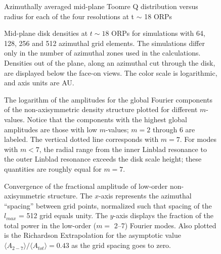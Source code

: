 \documentclass[manuscript]{aastex}
\begin{document}


\newpage

\begin{figure}
\caption{Azimuthally averaged mid-plane Toomre Q distribution versus radius for each of the four resolutions at t $\sim$ 18 ORPs}
\label{fig:Final_Q}
\end{figure}

\begin{figure}
\caption
{
Mid-plane disk densities at $t \sim 18$ ORPs for simulations with 64, 128, 256 and 512 azimuthal grid elements.
The simulations differ only in the number of  azimuthal zones used in the calculations.  Densities out of the plane, along an azimuthal cut through the disk, are displayed below the face-on views.  The color scale is logarithmic, and axis units are AU. 
}
\label{fig:DensityPlots}
\end{figure}
\newpage

\begin{figure}
\caption
{
The logarithm of the amplitudes for the global Fourier components of the non-axisymmetric density structure plotted for different $m$-values. Notice that the components with the highest global amplitudes are those with low $m$-values; $m=2$ through 6 are labeled.  The vertical dotted line corresponds with $m=7$.  For modes with $m < 7$,  the radial range from  the inner Linblad resonance to the outer Linblad resonance exceeds the disk scale height; these quantities are roughly equal for $m = 7$.
}
\label{fig:Am_vs_log_m}
\end{figure}

\begin{figure}
\caption
{
Convergence of the fractional amplitude of low-order non-axisymmetric structure.  The $x$-axis represents
the azimuthal ``spacing'' between grid points,  normalized such that spacing of the $l_{max}$ = 512 grid
equals unity.
The $y$-axis displays the fraction of the total power in the low-order ($m = $ 2--7) Fourier modes. 
Also plotted is the Richardson Extrapolation for the asymptotic value  
$\langle A_{2-7} \rangle / \langle A_{tot} \rangle = 0.43$ as the grid spacing goes to zero.  
}
\label{fig:Power_Extrap}
\end{figure}
\end{document}
